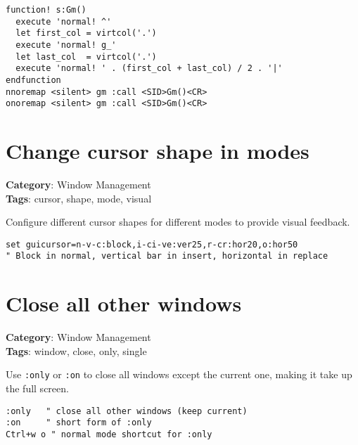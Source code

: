 {{{{{{{{{{{{{{{{{{\begin{Exa*}{}
\begin{Verbatim}[fontsize=\footnotesize, breaklines, breakanywhere]
function! s:Gm()
  execute 'normal! ^'
  let first_col = virtcol('.')
  execute 'normal! g_'
  let last_col  = virtcol('.')
  execute 'normal! ' . (first_col + last_col) / 2 . '|'
endfunction
nnoremap <silent> gm :call <SID>Gm()<CR>
onoremap <silent> gm :call <SID>Gm()<CR>
\end{Verbatim}
\end{Exa*}

\section{Change cursor shape in modes}

\textbf{Category}: Window Management\\ \textbf{Tags}: cursor, shape, mode, visual
\vspace{0.5cm}

Configure different cursor shapes for different modes to provide visual feedback.

\begin{Exa*}{}
\begin{Verbatim}[fontsize=\footnotesize, breaklines, breakanywhere]
set guicursor=n-v-c:block,i-ci-ve:ver25,r-cr:hor20,o:hor50
" Block in normal, vertical bar in insert, horizontal in replace
\end{Verbatim}
\end{Exa*}

\section{Close all other windows}

\textbf{Category}: Window Management\\ \textbf{Tags}: window, close, only, single
\vspace{0.5cm}

Use {\footnotesize \Verb§:only§} or {\footnotesize \Verb§:on§} to close all windows except the current one, making it take up the full screen.

\begin{Exa*}{}
\begin{Verbatim}[fontsize=\footnotesize, breaklines, breakanywhere]
:only   " close all other windows (keep current)
:on     " short form of :only
Ctrl+w o " normal mode shortcut for :only
\end{Verbatim}
\end{Exa*}

}}}}}}}}}}}}}}}}}}
